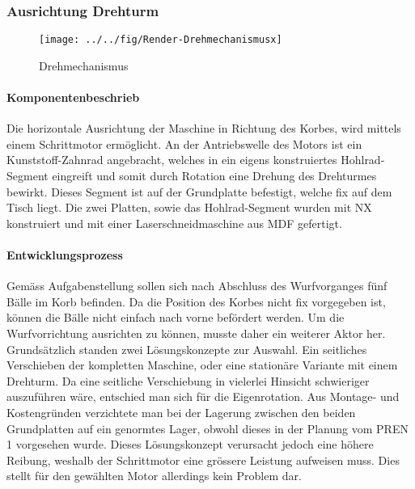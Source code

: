 \subsubsection{Ausrichtung Drehturm}
\begin{figure}[h!]
	\centering
		\texttt{[image: ../../fig/Render-Drehmechanismusx]}
	\caption{Drehmechanismus}
	\label{fig:Drehmechanismus}
\end{figure}
\paragraph{Komponentenbeschrieb}
Die horizontale Ausrichtung der Maschine in Richtung des Korbes, wird mittels einem Schrittmotor ermöglicht. An der Antriebswelle des Motors ist ein Kunststoff-Zahnrad angebracht, welches in ein eigens konstruiertes Hohlrad-Segment eingreift und somit durch Rotation eine Drehung des Drehturmes bewirkt. Dieses Segment ist auf der Grundplatte befestigt, welche fix auf dem Tisch liegt. Die zwei Platten, sowie das Hohlrad-Segment wurden mit NX konstruiert und mit einer Laserschneidmaschine aus MDF gefertigt.

\paragraph{Entwicklungsprozess}
Gemäss Aufgabenstellung sollen sich nach Abschluss des Wurfvorganges fünf Bälle im Korb befinden. Da die Position des Korbes nicht fix vorgegeben ist, können die Bälle nicht einfach nach vorne befördert werden. Um die Wurfvorrichtung ausrichten zu können, musste daher ein weiterer Aktor her. Grundsätzlich standen zwei Lösungskonzepte zur Auswahl. Ein seitliches Verschieben der kompletten Maschine, oder eine stationäre Variante mit einem Drehturm. Da eine seitliche Verschiebung in vielerlei Hinsicht schwieriger auszuführen wäre, entschied man sich für die Eigenrotation. Aus Montage- und Kostengründen verzichtete man bei der Lagerung zwischen den beiden Grundplatten auf ein genormtes Lager, obwohl dieses in der Planung vom PREN 1 vorgesehen wurde. Dieses Lösungskonzept verursacht jedoch eine höhere Reibung, weshalb der Schrittmotor eine grössere Leistung aufweisen muss. Dies stellt für den gewählten Motor allerdings kein Problem dar.